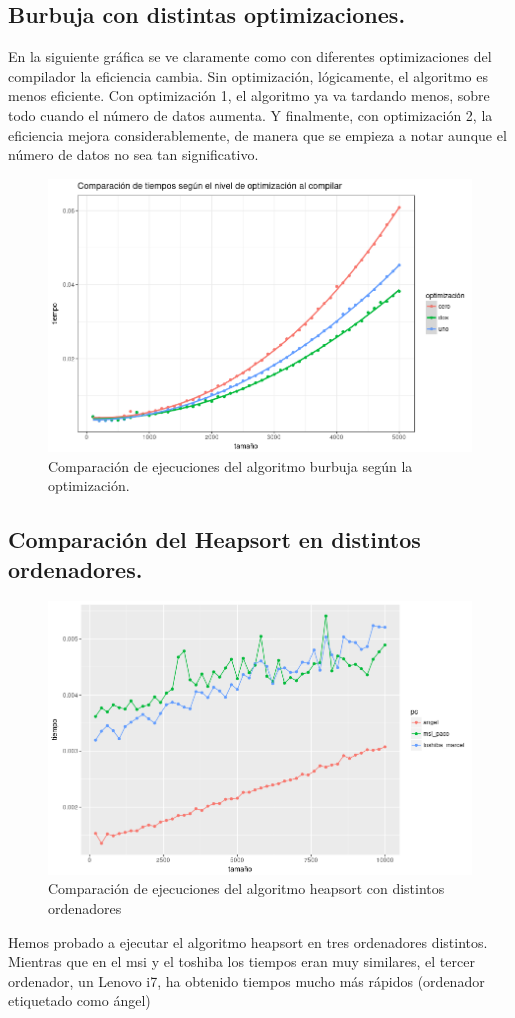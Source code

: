 \documentclass[a4paper, 11pt]{article}
\begin{document}
\subsection{Burbuja con distintas optimizaciones.}
En la siguiente gráfica se ve claramente como con diferentes optimizaciones del compilador la eficiencia cambia. Sin optimización, lógicamente, el algoritmo es menos eficiente. Con optimización 1, el algoritmo ya va tardando menos, sobre todo cuando el número de datos aumenta. Y finalmente, con optimización 2, la eficiencia mejora considerablemente, de manera que se empieza a notar aunque el número de datos no sea tan significativo.
\begin{figure}[!hbp]
	\includegraphics[width=\textwidth]{burbujaopt.png}
	\caption{Comparación de ejecuciones del algoritmo burbuja según la optimización.\label{opt}}
\end{figure}
\pagebreak
\subsection{Comparación del Heapsort en distintos ordenadores.}
\begin{figure}[!hbp]
	\includegraphics[width=\textwidth]{ordenadores.png}
	\caption{Comparación de ejecuciones del algoritmo  heapsort con distintos ordenadores\label{ordenadores}}
\end{figure}
Hemos probado a ejecutar el algoritmo heapsort en tres ordenadores distintos. Mientras que en el msi y el toshiba los tiempos eran muy similares, el tercer ordenador, un Lenovo i7, ha obtenido tiempos mucho más rápidos (ordenador etiquetado como ángel)
\pagebreak
\end{document}
